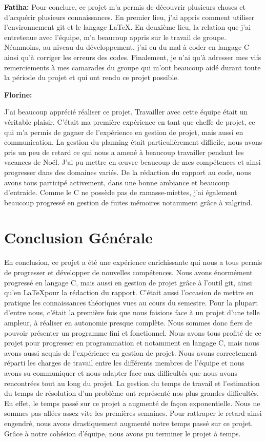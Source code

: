 \documentclass{article}
\begin{document}
\textbf{Fatiha:}
Pour conclure, ce projet m’a permis de découvrir plusieurs choses et d’acquérir plusieurs connaissances.
En premier lieu, j’ai appris comment utiliser l’environnement git et le langage \LaTeX.
En deuxième lieu, la relation que j’ai entretenue avec l’équipe, m’a beaucoup appris sur le travail de groupe.
Néanmoins, au niveau du développement, j’ai eu du mal à coder en langage C ainsi qu'à corriger les erreurs des codes. Finalement, je n’ai qu’à adresser mes vifs remerciements à mes camarades du groupe qui m’ont beaucoup aidé durant toute la période du projet et qui ont rendu ce projet possible.
\medskip

\textbf{Florine:}

J'ai beaucoup apprécié réaliser ce projet. Travailler avec cette équipe était un véritable plaisir. C'était ma première expérience en tant que cheffe de projet, ce qui m'a permis de gagner de l'expérience en gestion de projet, mais aussi en communication. La gestion du planning était particulièrement difficile, nous avons pris un peu de retard ce qui nous a amené à beaucoup travailler pendant les vacances de Noël. 
J'ai pu mettre en œuvre beaucoup de mes compétences et ainsi progresser dans des domaines variés. De la rédaction du rapport au code, nous avons tous participé activement, dans une bonne ambiance et beaucoup d'entraide.
Comme le C ne possède pas de ramasse-miettes, j'ai également beaucoup progressé en gestion de fuites mémoires notamment grâce à valgrind.
\medskip

\clearpage
\section{Conclusion Générale}


En conclusion, ce projet a été une expérience enrichissante qui nous a tous permis de progresser et développer de nouvelles compétences.
\newline
Nous avons énormément progressé en langage C, mais aussi en gestion de projet grâce à l'outil git, ainsi qu'en \LaTeX pour la rédaction du rapport. C'était aussi l'occasion de mettre en pratique les connaissances théoriques vues au cours du semestre.
Pour la plupart d'entre nous, c'était la première fois que nous faisions face à un projet d'une telle ampleur, à réaliser en autonomie presque complète. Nous sommes donc fiers de pouvoir présenter un programme fini et fonctionnel. Nous avons tous profité de ce projet pour progresser en programmation et notamment en langage C, mais nous avons aussi acquis de l'expérience en gestion de projet. 
\newline
Nous avons correctement réparti les charges de travail entre les différents membres de l'équipe et nous avons su communiquer et nous adapter face aux difficultés que nous avons rencontrées tout au long du projet. La gestion du temps de travail et l'estimation du temps de résolution d'un problème ont représenté nos plus grandes difficultés. En effet, le temps passé sur ce projet a augmenté de façon exponentielle. Nous ne sommes pas allées assez vite les premières semaines. Pour rattraper le retard ainsi engendré, nous avons drastiquement augmenté notre temps passé sur ce projet. Grâce à notre cohésion d'équipe, nous avons pu terminer le projet à temps.

	
\end{document}
